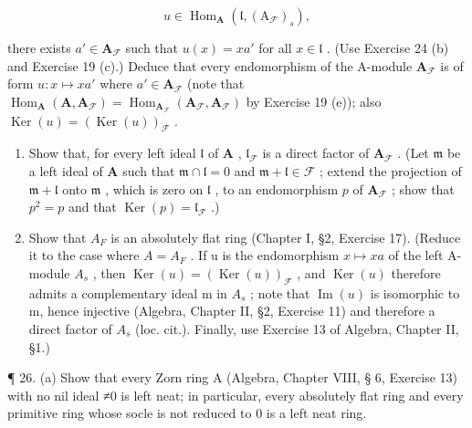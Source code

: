 \[
u \in \operatorname{Hom} _ {\mathbf {A}} (\mathfrak {l}, (\mathrm{A} _ {\mathcal {F}}) _ {s}),
\]

there exists \(a' \in \mathbf{A}_{\mathcal{F}}\) such that \(u(x) = xa'\) for all \(x \in \mathfrak{l}\) . (Use Exercise 24 (b) and Exercise 19 (c).) Deduce that every endomorphism of the A-module \(\mathbf{A}_{\mathcal{F}}\) is of form \(u: x \mapsto xa'\) where \(a' \in \mathbf{A}_{\mathcal{F}}\) (note that \(\operatorname{Hom}_{\mathbf{A}}(\mathbf{A}, \mathbf{A}_{\mathcal{F}}) = \operatorname{Hom}_{\mathbf{A}_{\mathcal{F}}}(\mathbf{A}_{\mathcal{F}}, \mathbf{A}_{\mathcal{F}})\) by Exercise 19 (e)); also \(\operatorname{Ker}(u) = (\operatorname{Ker}(u))_{\mathcal{F}}\) .

\begin{enumerate}
\def\labelenumi{(\alph{enumi})}
\setcounter{enumi}{2}
\item
  Show that, for every left ideal \(\mathfrak{l}\) of \(\mathbf{A}\) , \(\mathfrak{l}_{\mathcal{F}}\) is a direct factor of \(\mathbf{A}_{\mathcal{F}}\) . (Let \(\mathfrak{m}\) be a left ideal of \(\mathbf{A}\) such that \(\mathfrak{m} \cap \mathfrak{l} = 0\) and \(\mathfrak{m} + \mathfrak{l} \in \mathcal{F}\) ; extend the projection of \(\mathfrak{m} + \mathfrak{l}\) onto \(\mathfrak{m}\) , which is zero on \(\mathfrak{l}\) , to an endomorphism \(p\) of \(\mathbf{A}_{\mathcal{F}}\) ; show that \(p^2 = p\) and that \(\operatorname{Ker}(p) = \mathfrak{l}_{\mathcal{F}}\) .)
\item
  Show that \(A_{F}\) is an absolutely flat ring (Chapter I, §2, Exercise 17). (Reduce it to the case where \(A = A_{F}\) . If u is the endomorphism \(x \mapsto xa\) of the left A-module \(A_{s}\) , then \(\operatorname{Ker}(u) = (\operatorname{Ker}(u))_{\mathcal{F}}\) , and \(\operatorname{Ker}(u)\) therefore admits a complementary ideal m in \(A_{s}\) ; note that \(\operatorname{Im}(u)\) is isomorphic to m, hence injective (Algebra, Chapter II, §2, Exercise 11) and therefore a direct factor of \(A_{s}\) (loc. cit.). Finally, use Exercise 13 of Algebra, Chapter II, §1.)
\end{enumerate}

¶ 26. (a) Show that every Zorn ring A (Algebra, Chapter VIII, § 6, Exercise 13) with no nil ideal ≠0 is left neat; in particular, every absolutely flat ring and every primitive ring whose socle is not reduced to 0 is a left neat ring.

